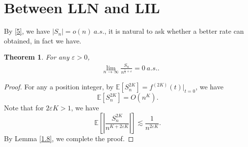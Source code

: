 \documentclass[11pt]{article}
\newtheorem{theorem}{Theorem}[section]
\theoremstyle{definition}
\newcommand{\abs}[1]{\left\vert#1\right\vert}
\begin{document}
\section{Between LLN and LIL}
By \eqref{5}, we have $\abs{S_n}=o(n) \ a.s.$, it is natural to ask whether a better rate can obtained, in fact we have.
\begin{theorem}
  For any $\varepsilon>0$,
\begin{equation*}
  \begin{aligned}
     & \lim_{n\rightarrow \infty} \frac{S_n}{n^{\frac{1}{2}+\varepsilon}}= 0 \ a.s..
  \end{aligned}
\end{equation*}
\end{theorem}
\begin{proof}
  For any a position integer, by $\mathbb{E}[S_n^{2K}]=f^{(2K)}(t)|_{t=0}$, we have
\[
\mathbb{E}[S_n^{2K}]=O(n^K).
\]
Note that for $2\varepsilon K>1$, we have
\[
\mathbb{E}\left[ \abs{\frac{S_n^{2K}}{n^{K+2\varepsilon K}}} \right]\lesssim \frac{1}{n^{2\varepsilon K}}. 
\]
By Lemma \ref{1.8}, we complete the proof.
\end{proof}
\end{document}
